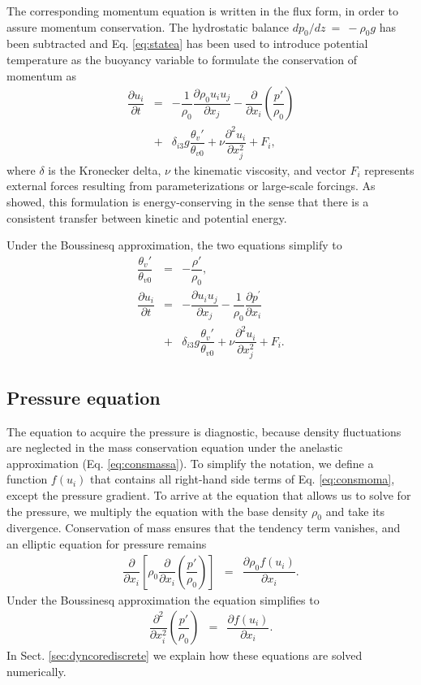 \documentclass[gmd,manuscript]{copernicus}
\begin{document}
The corresponding momentum equation is written in the flux form, in order to assure momentum conservation. The hydrostatic balance $dp_0 / dz~=~-\rho_0 g$ has been subtracted and Eq. \ref{eq:statea} has been used to introduce potential temperature as the buoyancy variable to formulate the conservation of momentum as
\begin{eqnarray}
\nonumber \dfrac{\partial u_i}{\partial t} & = & - \dfrac{1}{\rho_0} \dfrac{\partial \rho_0 u_i u_j}{\partial x_j} 
- \dfrac{\partial}{\partial x_i}\left(\dfrac{p'}{\rho_0}\right) \\
& + & \delta_{i3} g \dfrac{\theta_v'}{\theta_{v0}} + \nu \dfrac{\partial^2 u_i}{\partial x_j^2} + F_i,\label{eq:consmoma}
\end{eqnarray}
where $\delta$ is the Kronecker delta, $\nu$ the kinematic viscosity, and vector $F_i$ represents external forces resulting from parameterizations or large-scale forcings. As \citet{Bannon1996} showed, this formulation is energy-conserving in the sense that there is a consistent transfer between kinetic and potential energy.

Under the Boussinesq approximation, the two equations simplify to
\begin{eqnarray}
\dfrac{\theta_v'}{\theta_{v0}} & = & - \dfrac{\rho'}{\rho_0}\label{eq:stateb},\\
\nonumber \dfrac{\partial u_i}{\partial t} & = & - \dfrac{\partial u_i u_j}{\partial x_j} - \dfrac{1}{\rho_0}\dfrac{\partial p^\prime}{\partial x_i} \\
& + & \delta_{i3} g \dfrac{\theta_v'}{\theta_{v0}} + \nu \dfrac{\partial^2 u_i}{\partial x_j^2} + F_i \label{eq:consmomb}.
\end{eqnarray}

\subsection{Pressure equation}
The equation to acquire the pressure is diagnostic, because density fluctuations are neglected in the mass conservation equation under the anelastic approximation (Eq. \ref{eq:consmassa}). To simplify the notation, we define a function $f \left( u_i \right)$ that contains all right-hand side terms of Eq. \ref{eq:consmoma}, except the pressure gradient. To arrive at the equation that allows us to solve for the pressure, we multiply the equation with the base density $\rho_0$ and take its divergence. Conservation of mass ensures that the tendency term vanishes, and an elliptic equation for pressure remains
\begin{eqnarray}
\dfrac{\partial}{\partial x_i} 
\left[ \rho_0 \dfrac{\partial}{\partial x_i} \left( \dfrac{p'}{\rho_0} \right) \right] & = &
\dfrac{\partial \rho_0 f \left( u_i \right)}{\partial x_i}.\label{eq:presa}
\end{eqnarray}
Under the Boussinesq approximation the equation simplifies to
\begin{eqnarray}
\dfrac{\partial^2}{\partial x_i^2} \left( \dfrac{p'}{\rho_0} \right) & = &
\dfrac{\partial f \left( u_i \right)}{\partial x_i}.\label{eq:presb}
\end{eqnarray}
In Sect. \ref{sec:dyncorediscrete} we explain how these equations are solved numerically.
\end{document}
